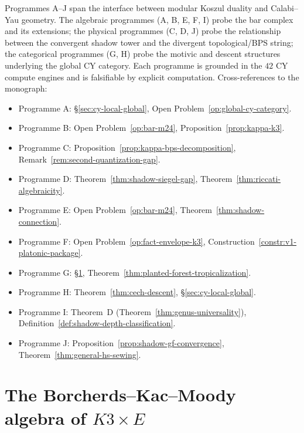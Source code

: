 \begin{remark}
\label{rem:cy-programme-summary}
Programmes A--J span the interface between modular Koszul
duality and Calabi--Yau geometry. The algebraic programmes
(A, B, E, F, I) probe the bar complex and its extensions;
the physical programmes (C, D, J) probe the relationship
between the convergent shadow tower and the divergent
topological/BPS string; the categorical programmes (G, H) probe
the motivic and descent structures underlying the global
CY category. Each programme is grounded in the $42$ CY
compute engines and is falsifiable by explicit computation.
Cross-references to the monograph:
\begin{itemize}
\item Programme A: \S\ref{sec:cy-local-global},
 Open Problem~\ref{op:global-cy-category}.
\item Programme B: Open Problem~\ref{op:bar-m24},
 Proposition~\ref{prop:kappa-k3}.
\item Programme C: Proposition~\ref{prop:kappa-bps-decomposition},
 Remark~\ref{rem:second-quantization-gap}.
\item Programme D: Theorem~\ref{thm:shadow-siegel-gap},
 Theorem~\ref{thm:riccati-algebraicity}.
\item Programme E: Open Problem~\ref{op:bar-m24},
 Theorem~\ref{thm:shadow-connection}.
\item Programme F: Open Problem~\ref{op:fact-envelope-k3},
 Construction~\ref{constr:v1-platonic-package}.
\item Programme G: \S\ref{sec:bkm-k3e},
 Theorem~\ref{thm:planted-forest-tropicalization}.
\item Programme H: Theorem~\ref{thm:cech-descent},
 \S\ref{sec:cy-local-global}.
\item Programme I: Theorem~D
 (Theorem~\ref{thm:genus-universality}),
 Definition~\ref{def:shadow-depth-classification}.
\item Programme J: Proposition~\ref{prop:shadow-gf-convergence},
 Theorem~\ref{thm:general-hs-sewing}.
\end{itemize}
\end{remark}


\section{The Borcherds--Kac--Moody algebra of \texorpdfstring{$K3 \times E$}{K3 x E}}
\label{sec:bkm-k3e}

